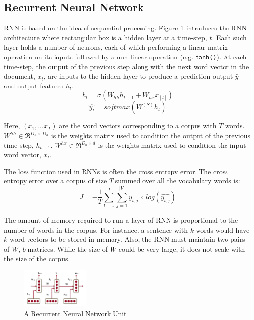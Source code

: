 \documentclass{article}
\begin{document}
\newpage



\newpage
\begin{appendices}
	
\section{Recurrent Neural Network}
\label{sec:rnn}

	RNN is based on the idea of sequential processing. Figure \ref{fig:rnn} introduces the RNN architecture where rectangular box is a hidden layer at a time-step, \(t\). Each such layer holds a number of neurons, each of which performing a linear matrix operation on its inputs followed by a non-linear operation (e.g. \texttt{tanh()}). At each time-step, the output of the previous step along with the next word vector in the document, \(x_t\), are inputs to the hidden layer to produce a prediction output \(\hat{y}\) and output features \(h_t\). 
	\[
		h_t = \sigma(W_{hh}h_{t-1} + W_{hx}x_{[t]}) \label{eq:1} \tag{1}  
	\]
	\[
		\hat{y_t} = softmax(W^{(S)} h_t) \label{eq:2} \tag{2}
	\]
	
	Here, \((x_1,... x_T)\) are the word vectors corresponding to a corpus with \(T\) words. \(W^{hh} \in \Re^{D_h \times D_h} \) is the weights matrix used to condition the output of the previous time-step, \(h_{t-1}\). \(W^{hx} \in \Re^{D_h \times d} \) is the weights matrix used to condition the input word
	vector, \(x_t\). 
	
	The loss function used in RNNs is often the cross entropy error. The cross entropy error over a corpus of size \(T\) summed over all the vocabulary words is:
	\[J = -\frac{1}{T} \sum_{t=1}^{T} \sum_{j=1}^{|V|} y_{t,j} \times log(\hat{y_{t,j}}) \tag{3}\]
	
	The amount of memory required to run a layer of RNN is proportional to the number of words in the corpus. For instance, a sentence with \(k\) words would have \(k\) word vectors to be stored in memory. Also, the RNN must maintain two pairs of \(W\), \(b\) matrices. While the size of \(W\) could be very large, it does not scale with the size of the corpus.
	
	\begin{figure} [H]
		\centering
		\includegraphics[width=0.3\textwidth]{fig/rnn.png}
		\caption{A Recurrent Neural Network Unit}
		\label{fig:rnn}
	\end{figure}
	

\end{appendices}
\end{document}
